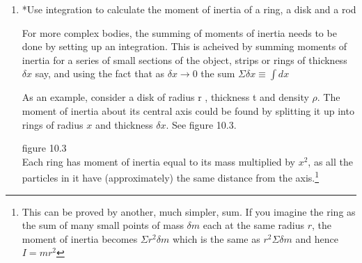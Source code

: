 \documentclass{article}
\begin{document}
\begin {enumerate}
A point mass $m$ at a distance $r$ from an axis of rotation will have Moment of Inertia $I=mr^2$

More generally the moment of inertia is the sum of all the $mr^2$ values for all the point masses that make up an object. For a small number of particles this can just be found by adding the values of individual moments of inertia.
\\
\item *Use integration to calculate the moment of inertia of a ring, a disk and a rod

For more complex bodies, the summing of moments of inertia needs to be done by setting up an integration. This is acheived by summing moments of inertia for a series of small sections of the object, strips or rings of thickness $\delta x$ say, and using the fact that as $\delta x \rightarrow0$ the sum $\Sigma \delta x \equiv \int dx$

As an example, consider a disk of radius r , thickness t and density $\rho$. The moment of inertia about its central axis could be found by splitting it up into rings of radius $x$ and thickness $\delta x$. See figure 10.3.
\\
\begin{figure}[h]
	\begin{center}
	\end{center}
\end{figure}



figure 10.3
\\

Each ring has moment of inertia equal to its mass multiplied by $x^2$, as all the particles in it have (approximately) the same distance from the axis.\footnote{This can be proved by another, much simpler, sum. If you imagine the ring as the sum of many small points of mass $\delta m$ each at the same radius $r$, the moment of inertia becomes $\Sigma r^{2}\delta m$ which is the same as $r^{2}\Sigma \delta m$ and hence $I=mr^2$}
\\


\end{enumerate}
\end{document}
